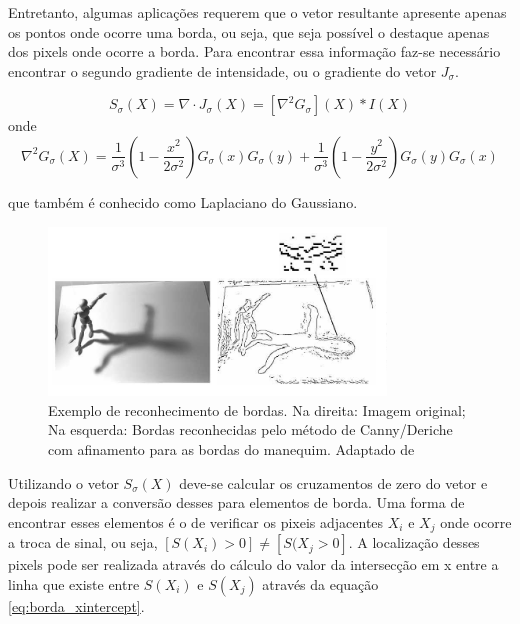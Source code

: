 Entretanto, algumas aplicações requerem que o vetor resultante apresente apenas os pontos onde ocorre uma borda, ou seja, que seja possível o destaque apenas dos pixels onde ocorre a borda. Para encontrar essa informação faz-se necessário encontrar o segundo gradiente de intensidade, ou o gradiente do vetor $J_{\sigma}$.
\par
\begin{equation}
    S_{\sigma}(X) = \nabla \cdot J_{\sigma}(X) = [\nabla^2G_{\sigma}](X) * I(X)
    \label{eq:borda_s}
\end{equation}
onde
\begin{equation}
    \nabla^2G_{\sigma}(X) = \frac{1}{\sigma^3} (1 - \frac{x^2}{2\sigma^2}) G_{\sigma}(x) G_{\sigma}(y) + \frac{1}{\sigma^3} (1 - \frac{y^2}{2\sigma^2}) G_{\sigma}(y) G_{\sigma}(x)
    \label{eq:borda_sgradiente}
\end{equation}
\par
que também é conhecido como Laplaciano do Gaussiano. \cite{marr1980theory}
\begin{figure}[ht]
    \centering
    \includegraphics[width=0.8\textwidth]{capitulos/reconhecimento_borda.png}
    \caption{Exemplo de reconhecimento de bordas. Na direita: Imagem original; Na esquerda: Bordas reconhecidas pelo método de Canny/Deriche com afinamento para as bordas do manequim. Adaptado de \cite{szeliski2021computer}}
    \label{fig:reconhecimento_borda}
\end{figure}
\par
Utilizando o vetor $S_{\sigma}(X)$ deve-se calcular os cruzamentos de zero do vetor e depois realizar a conversão desses para elementos de borda. Uma forma de encontrar esses elementos é o de verificar os pixeis adjacentes $X_{i}$ e $X_{j}$ onde ocorre a troca de sinal, ou seja, $[S(X_{i}) > 0] \neq [S(X_{j} > 0]$. A localização desses pixels pode ser realizada através do cálculo do valor da intersecção em x entre a linha que existe entre $S(X_{i})$ e $S(X_{j})$ através da equação \ref{eq:borda_xintercept}. \cite{szeliski2021computer} \cite{marr1980theory}
